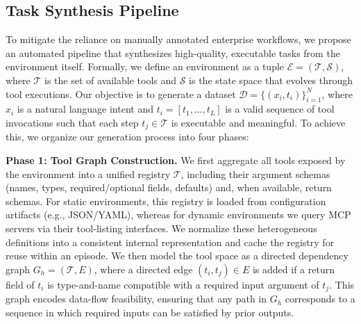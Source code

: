\documentclass{article}
\theoremstyle{plain}
\theoremstyle{definition}
\theoremstyle{remark}
\begin{document}
\vspace{-0.2cm}
\subsection{Task Synthesis Pipeline}
\label{sec:scapia-data}
\vspace{-0.2cm}
To mitigate the reliance on manually annotated enterprise workflows, we propose an automated pipeline that synthesizes high-quality, executable tasks from the environment itself. Formally, we define an environment as a tuple $\mathcal{E} = (\mathcal{T}, \mathcal{S})$, where $\mathcal{T}$ is the set of available tools and $\mathcal{S}$ is the state space that evolves through tool executions.
 Our objective is to generate a dataset $\mathcal{D} = \{(x_i, t_i)\}_{i=1}^N$, where $x_i$ is a natural language intent and $t_i = [t_1, \dots, t_L]$ is a valid sequence of tool invocations such that each step $t_j \in \mathcal{T}$ is executable and meaningful. To achieve this, we organize our generation process into four phases:

\textbf{Phase 1: Tool Graph Construction.} We first aggregate all tools exposed by the environment into a unified registry $\mathcal{T}$, including their argument schemas (names, types, required/optional fields, defaults) and, when available, return schemas. For static environments, this registry is loaded from configuration artifacts (e.g., JSON/YAML), whereas for dynamic environments we query MCP servers via their tool-listing interfaces. We normalize these heterogeneous definitions into a consistent internal representation and cache the registry for reuse within an episode. We then model the tool space as a directed dependency graph $G_h = (\mathcal{T}, E)$, where a directed edge $(t_i, t_j) \in E$ is added if a return field of $t_i$ is type-and-name compatible with a required input argument of $t_j$. This graph encodes data-flow feasibility, ensuring that any path in $G_h$ corresponds to a sequence in which required inputs can be satisfied by prior outputs.
\end{document}
